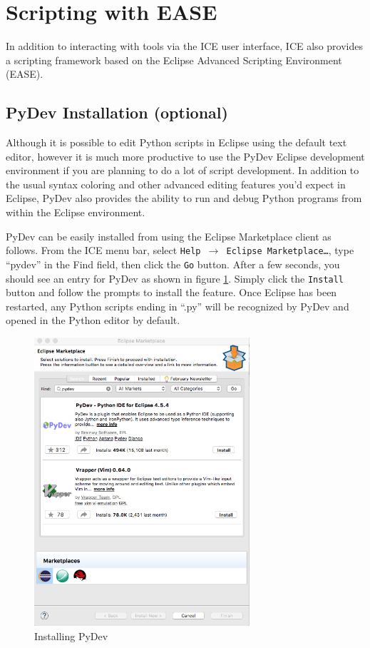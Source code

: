 \section{Scripting with EASE}
In addition to interacting with tools via the ICE user interface, ICE also
provides a scripting framework based on the Eclipse Advanced Scripting
Environment (EASE). 

\subsection{PyDev Installation (optional)} 

Although it is possible to edit Python scripts in Eclipse using the default text editor,
however it is much more productive to use the PyDev Eclipse development
environment if you are planning to do a lot of script development. In addition to the 
usual syntax coloring and other advanced editing features you'd expect in Eclipse, 
PyDev also provides the ability to run and debug Python programs from within the Eclipse environment.

PyDev can be easily installed from using the Eclipse Marketplace client as
follows. From the ICE menu bar, select \texttt{Help $\rightarrow$ Eclipse
Marketplace\ldots}, type ``pydev'' in the Find field, then click the \texttt{Go}
button.
After a few seconds, you should see an entry for PyDev as shown in figure
\ref{fig:pydev}.
Simply click the \texttt{Install} button and follow the prompts to install the feature. Once
Eclipse has been restarted, any Python scripts ending in ``.py'' will be recognized by
PyDev and opened in the Python editor by default.

\begin{figure}[!ht]
\centering
\includegraphics[width=8cm]{images/pydev-marketplace}
\caption{Installing PyDev}
\label{fig:pydev}
\end{figure}

